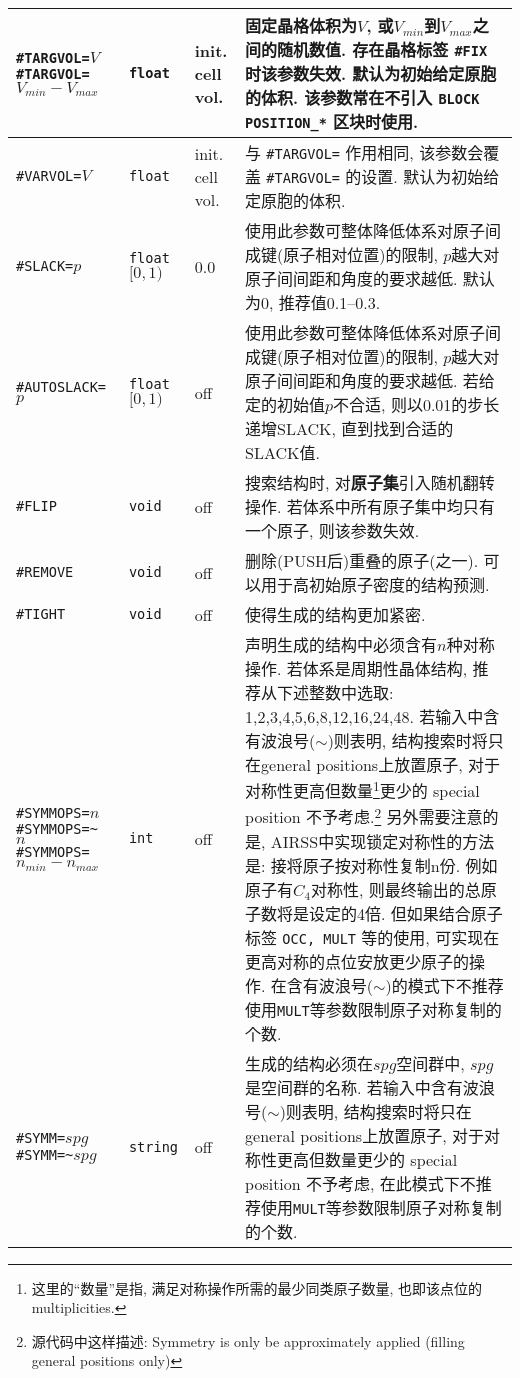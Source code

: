 \documentclass[a4paper, 10pt]{article}
\begin{document}
\begin{center}
\begin{longtable}{m{11em}|m{4em}<{\centering}|m{3em}<{\centering}|m{15em}}
\midrule
\verb|#TARGVOL=|\(V\) \verb|#TARGVOL=|\(V_{min}-V_{max}\) & \verb|float| & init. cell vol. & 固定晶格体积为\(V\), 或\(V_{min}\)到\(V_{max}\)之间的随机数值. 存在晶格标签 \verb|#FIX| 时该参数失效. 默认为初始给定原胞的体积. 该参数常在不引入 \verb|BLOCK POSITION_*| 区块时使用.\\
\midrule
\verb|#VARVOL=|\(V\)& \verb|float| & init. cell vol. & 与 \verb|#TARGVOL=| 作用相同, 该参数会覆盖 \verb|#TARGVOL=| 的设置. 默认为初始给定原胞的体积.\\
\midrule
\verb|#SLACK=|\(p\)& \verb|float| \([0,1)\) & 0.0 & 使用此参数可整体降低体系对原子间成键(原子相对位置)的限制, \(p\)越大对原子间间距和角度的要求越低. 默认为0, 推荐值0.1--0.3.\\
\midrule
\verb|#AUTOSLACK=|\(p\)& \verb|float| \([0,1)\) & off & 使用此参数可整体降低体系对原子间成键(原子相对位置)的限制, \(p\)越大对原子间间距和角度的要求越低. 若给定的初始值\(p\)不合适, 则以0.01的步长递增SLACK, 直到找到合适的SLACK值.\\
\midrule
\verb|#FLIP|& \verb|void| & off & 搜索结构时, 对\textbf{原子集}引入随机翻转操作. 若体系中所有原子集中均只有一个原子, 则该参数失效.\\
\midrule
\verb|#REMOVE|& \verb|void| & off & 删除(PUSH后)重叠的原子(之一). 可以用于高初始原子密度的结构预测.\\
\midrule
\verb|#TIGHT|& \verb|void| & off & 使得生成的结构更加紧密.\\
\midrule
\verb|#SYMMOPS=|\(n\)\hspace{6em}\verb|#SYMMOPS=~|\(n\;\;\;\;\;\;\;\;\;\;\;\)\hspace{6em}\verb|#SYMMOPS=|\(n_{min}-n_{max}\) & \verb|int| &  off & 声明生成的结构中必须含有\(n\)种对称操作. 若体系是周期性晶体结构, 推荐从下述整数中选取: 1,2,3,4,5,6,8,12,16,24,48. 若输入中含有波浪号(\(\sim\))则表明, 结构搜索时将只在general positions上放置原子, 对于对称性更高但数量\footnote{这里的``数量''是指, 满足对称操作所需的最少同类原子数量, 也即该点位的 multiplicities. }更少的 special position 不予考虑.\footnote{源代码中这样描述: Symmetry is only be approximately applied (filling general positions only)} 另外需要注意的是, AIRSS中实现锁定对称性的方法是: 接将原子按对称性复制n份. 例如原子有\(C_4\)对称性, 则最终输出的总原子数将是设定的4倍. 但如果结合原子标签 \verb|OCC, MULT| 等的使用, 可实现在更高对称的点位安放更少原子的操作. 在含有波浪号(\(\sim\))的模式下不推荐使用\verb|MULT|等参数限制原子对称复制的个数.\\
\midrule
\verb|#SYMM=|\(spg\)\hspace{6em} \verb|#SYMM=~|\(spg\)& \verb|string| & off & 生成的结构必须在\(spg\)空间群中, \(spg\)是空间群的名称. 若输入中含有波浪号(\(\sim\))则表明, 结构搜索时将只在general positions上放置原子, 对于对称性更高但数量更少的 special position 不予考虑, 在此模式下不推荐使用\verb|MULT|等参数限制原子对称复制的个数.\\

\end{longtable}
\end{center}
\end{document}
